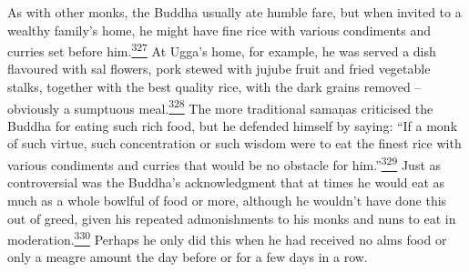 As with other monks, the Buddha usually ate humble fare, but when
invited to a wealthy family's home, he might have fine rice with various
condiments and curries set before
him.\label{footprints_split_011.html_fnref327}\hyperref[footprints_split_024.htmlux5cux23fn327]{\textsuperscript{327}}
At Ugga's home, for example, he was served a dish flavoured with sal
flowers, pork stewed with jujube fruit and fried vegetable stalks,
together with the best quality rice, with the dark grains removed --
obviously a sumptuous
meal.\label{footprints_split_011.html_fnref328}\hyperref[footprints_split_024.htmlux5cux23fn328]{\textsuperscript{328}}
The more traditional samaṇas criticised the Buddha for eating such rich
food, but he defended himself by saying: ``If a monk of such virtue,
such concentration or such wisdom were to eat the finest rice with
various condiments and curries that would be no obstacle for
him.''\label{footprints_split_011.html_fnref329}\hyperref[footprints_split_024.htmlux5cux23fn329]{\textsuperscript{329}}
Just as controversial was the Buddha's acknowledgment that at times he
would eat as much as a whole bowlful of food or more, although he
wouldn't have done this out of greed, given his repeated admonishments
to his monks and nuns to eat in
moderation.\label{footprints_split_011.html_fnref330}\hyperref[footprints_split_024.htmlux5cux23fn330]{\textsuperscript{330}}
Perhaps he only did this when he had received no alms food or only a
meagre amount the day before or for a few days in a row.

